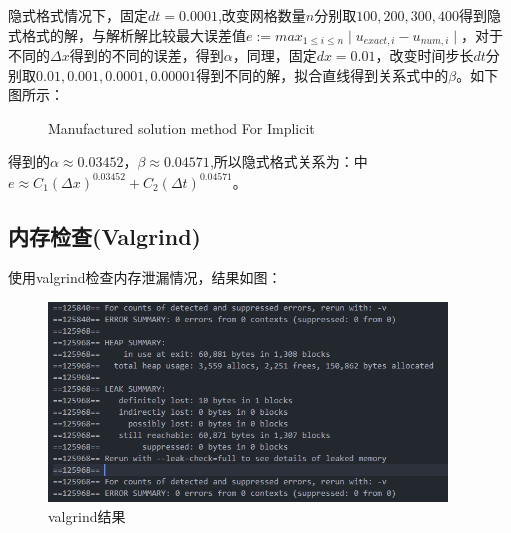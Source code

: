 \documentclass[
	20pt%
]{SUSTechHomework}
\begin{document}
\qquad 隐式格式情况下，固定$dt=0.0001$,改变网格数量$n$分别取$100, 200, 300, 400 $得到隐式格式的解，与解析解比较最大误差值$e:=max_{1 \leq i \leq n}\mid u_{exact,i} - u_{num,i}\mid$，对于不同的$\Delta x$得到的不同的误差，得到$\alpha$，同理，固定$dx=0.01$，改变时间步长$dt$分别取$0.01, 0.001, 0.0001, 0.00001$得到不同的解，拟合直线得到关系式中的$\beta$。如下图所示：
\begin{figure}[h]
    \centering
    \caption{Manufactured solution method For Implicit}
    \label{fig:my_label}
\end{figure}

\qquad 得到的$\alpha \approx 0.03452$，$\beta \approx 0.04571$,所以隐式格式关系为：中$e \approx C_1 (\Delta x)^{0.03452} + C_2 (\Delta t)^{0.04571}$。
\subsection{内存检查(Valgrind)}
\qquad 使用valgrind检查内存泄漏情况，结果如图：
\begin{figure}[h]
    \centering
    \includegraphics[width=300pt]{img/valgrind.jpg}
    \caption{valgrind结果}
    \label{fig:my_label}
\end{figure}
\end{document}
